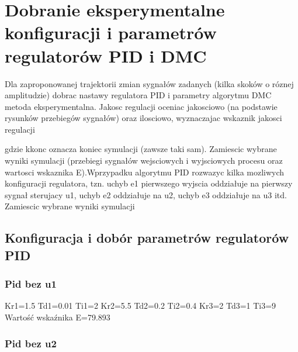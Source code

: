 \section{Dobranie eksperymentalne konfiguracji i parametrów regulatorów PID i DMC}
\label{projekt:zad4}

Dla zaproponowanej trajektorii zmian sygnałów zadanych (kilka skoków o róznej amplitudzie)
dobrac nastawy regulatora PID i parametry algorytmu DMC metoda eksperymentalna.
Jakosc regulacji oceniac jakosciowo (na podstawie rysunków przebiegów
sygnałów) oraz ilosciowo, wyznaczajac wskaznik jakosci regulacji

gdzie kkonc oznacza koniec symulacji (zawsze taki sam). Zamiescic wybrane wyniki symulacji
(przebiegi sygnałów wejsciowych i wyjsciowych procesu oraz wartosci wskaznika
E).Wprzypadku algorytmu PID rozwazyc kilka mozliwych konfiguracji regulatora,
tzn. uchyb e1 pierwszego wyjscia oddziałuje na pierwszy sygnał sterujacy u1, uchyb
e2 oddziałuje na u2, uchyb e3 oddziałuje na u3 itd. Zamiescic wybrane wyniki symulacji

\subsection{Konfiguracja i dobór parametrów regulatorów PID}

\subsubsection{Pid bez u1}

Kr1=1.5 Td1=0.01 Ti1=2 Kr2=5.5 Td2=0.2 Ti2=0.4 Kr3=2 Td3=1 Ti3=9
Wartość wskaźnika E=79.893

%     

%     

\subsubsection{Pid bez u2}

